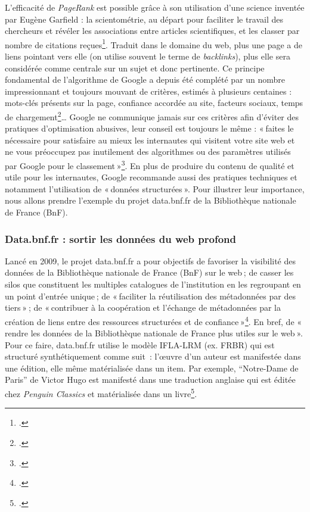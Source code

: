 L'efficacité de \textit{PageRank} est possible grâce à son utilisation d’une science inventée par Eugène Garfield : la scientométrie, au départ pour faciliter le travail des chercheurs et révéler les associations entre articles scientifiques, et les classer par nombre de citations reçues\footcite[§ 5]{cardon2013}. Traduit dans le domaine du web, plus une page a de liens pointant vers elle (on utilise souvent le terme de \textit{backlinks}), plus elle sera considérée comme centrale sur un sujet et donc pertinente. Ce principe fondamental de l’algorithme de Google a depuis été complété par un nombre impressionnant et toujours mouvant de critères, estimés à plusieurs centaines : mots-clés présents sur la page, confiance accordée au site, facteurs sociaux, temps de chargement\footcite{ertzscheid2019}… Google ne communique jamais sur ces critères afin d’éviter des pratiques d’optimisation abusives, leur conseil est toujours le même : « faites le nécessaire pour satisfaire au mieux les internautes qui visitent votre site web et ne vous préoccupez pas inutilement des algorithmes ou des paramètres utilisés par Google pour le classement »\footcite{zotero-236}. En plus de produire du contenu de qualité et utile pour les internautes, Google recommande aussi des pratiques techniques et notamment l’utilisation de « données structurées ». Pour illustrer leur importance, nous allons prendre l’exemple du projet data.bnf.fr de la Bibliothèque nationale de France (BnF).

\subsubsection{Data.bnf.fr : sortir les données du web profond}

Lancé en 2009, le projet data.bnf.fr a pour objectifs de favoriser la visibilité des données de la Bibliothèque nationale de France (BnF) sur le web ; de casser les silos que constituent les multiples catalogues de l’institution en les regroupant en un point d’entrée unique ; de « faciliter la réutilisation des métadonnées par des tiers » ; de « contribuer à la coopération et l’échange de métadonnées par la création de liens entre des ressources structurées et de confiance »\footcite{s.d.}. En bref, de « rendre les données de la Bibliothèque nationale de France plus utiles sur le web ». Pour ce faire, data.bnf.fr utilise le modèle IFLA-LRM (ex. FRBR) qui est structuré synthétiquement comme suit : l’œuvre d’un auteur est manifestée dans une édition, elle même matérialisée dans un item. Par exemple, \enquote{Notre-Dame de Paris} de Victor Hugo est manifesté dans une traduction anglaise qui est éditée chez \textit{Penguin Classics} et matérialisée dans un livre\footcite{bermes2023}.


